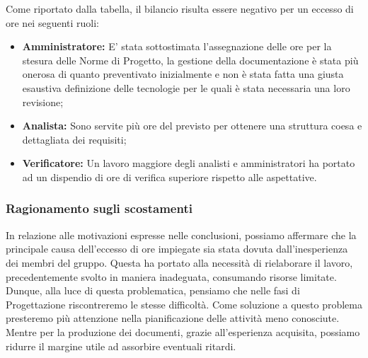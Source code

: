 Come riportato dalla tabella, il bilancio risulta essere negativo per un eccesso di ore nei seguenti ruoli:

\begin{itemize}
	\item \textbf{Amministratore:} E' stata sottostimata l'assegnazione delle ore per la stesura delle Norme di Progetto, la gestione della documentazione è stata più onerosa di quanto preventivato inizialmente e non è stata fatta una giusta esaustiva definizione delle tecnologie per le quali è stata necessaria una loro revisione;
	\item \textbf{Analista:} Sono servite più ore del previsto per ottenere una struttura coesa e dettagliata dei requisiti;
	\item \textbf{Verificatore:} Un lavoro maggiore degli analisti e amministratori ha portato ad un dispendio di ore di verifica superiore rispetto alle aspettative.
\end{itemize}
\subsubsection{Ragionamento sugli scostamenti}

In relazione alle motivazioni espresse nelle conclusioni, possiamo affermare che la principale causa dell'eccesso di ore impiegate sia stata dovuta dall'inesperienza dei membri del gruppo. Questa ha portato alla necessità di rielaborare il lavoro, precedentemente svolto in maniera inadeguata, consumando risorse limitate.
Dunque, alla luce di questa problematica, pensiamo che nelle fasi di Progettazione riscontreremo le stesse difficoltà. Come soluzione a questo problema presteremo più attenzione nella pianificazione delle attività meno conosciute. Mentre per la produzione dei documenti, grazie all'esperienza acquisita, possiamo ridurre il margine utile ad assorbire eventuali ritardi.

